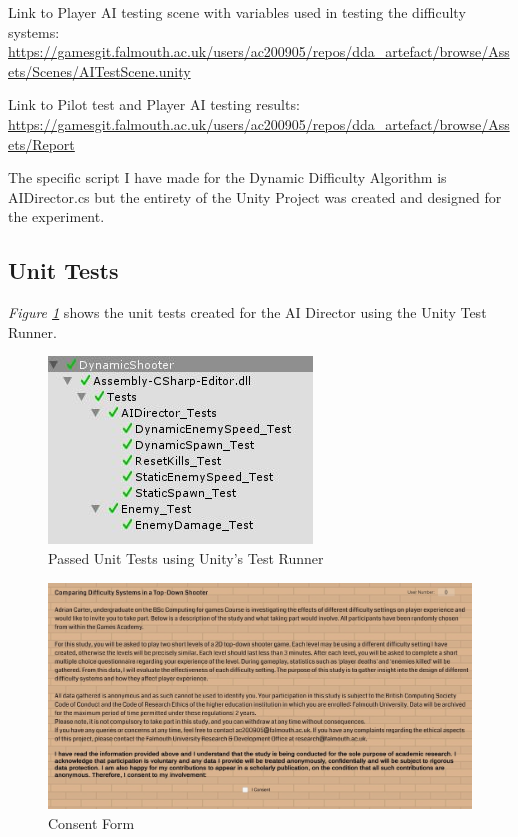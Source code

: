 \documentclass[journal]{IEEEtran}
\begin{document}
Link to Player AI testing scene with variables used in testing the difficulty systems:
\url{https://gamesgit.falmouth.ac.uk/users/ac200905/repos/dda_artefact/browse/Assets/Scenes/AITestScene.unity}

Link to Pilot test and Player AI testing results:
\url{https://gamesgit.falmouth.ac.uk/users/ac200905/repos/dda_artefact/browse/Assets/Report}

The specific script I have made for the Dynamic Difficulty Algorithm is AIDirector.cs but the entirety of the Unity Project was created and designed for the experiment.

\subsection{Unit Tests}
\textit{Figure \ref{fig::8}} shows the unit tests created for the AI Director using the Unity Test Runner.

\begin{figure}[h]
	\includegraphics[width=1.0\linewidth]{unittests.jpg}
	\caption{Passed Unit Tests using Unity's Test Runner}
	\label{fig::8}
\end{figure}

\begin{figure}[h]
	\includegraphics[width=0.75\linewidth]{consentformingame.jpg}
	\caption{Consent Form}
	\label{fig::9}
\end{figure} 
\end{document}
